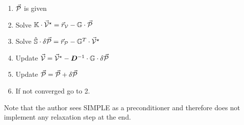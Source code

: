 \begin{enumerate}
\item $\vec{\cal P}$ is given
\item Solve ${\mathbb{K}} \cdot \vec{\cal V}^\star = \vec{r}_{\cal V} - {\mathbb{G}} \cdot \vec{\cal P}  $
\item Solve $\hat{{\mathbb{S}}} \cdot \delta\vec{\cal P} = \vec{r}_{\cal P} - {\mathbb{G}}^T \cdot \vec{\cal V}^\star $
\item Update $\vec{\cal V} = \vec{\cal V}^\star - {\bm D}^{-1} \cdot {\mathbb{G}} \cdot \delta \vec{\cal P} $
\item Update $\vec{\cal P} = \vec{\cal P} + \delta \vec{\cal P} $
\item If not converged go to 2.
\end{enumerate}

Note that the author sees SIMPLE as a preconditioner and therefore 
does not implement any relaxation step at the end.



